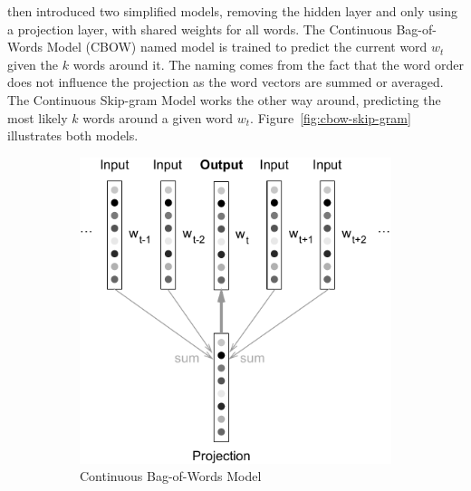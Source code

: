 \cite{Mikolov:2013ad} then introduced two simplified models, removing the hidden layer and only using a projection layer, with shared weights for all words. The Continuous Bag-of-Words Model (CBOW) named model is trained to predict the current word $w_t$ given the $k$ words around it. The naming comes from the fact that the word order does not influence the projection as the word vectors are summed or averaged. The Continuous Skip-gram Model works the other way around, predicting the most likely $k$ words around a given word $w_t$. Figure~\ref{fig:cbow-skip-gram} illustrates both models.


\begin{figure}[h]
    \centering
    \begin{subfigure}[b]{0.49\textwidth}
        \includegraphics[width=\textwidth]{img/cbow_vert2.pdf}
        \caption{Continuous Bag-of-Words Model}
\label{fig:cbow}
    \end{subfigure}
    \begin{subfigure}[b]{0.49\textwidth}

\end{subfigure}
\end{figure}
